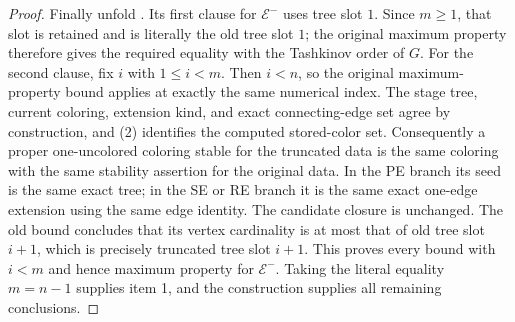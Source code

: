 \begin{proof}
Finally unfold .  Its first clause for
$\mathcal E^-$ uses tree slot $1$.  Since $m\geq1$, that slot is retained
and is literally the old tree slot $1$; the original maximum property
therefore gives the required equality with the Tashkinov order of $G$.
For the second clause, fix $i$ with $1\leq i<m$.  Then $i<n$, so the
original maximum-property bound applies at exactly the same numerical
index.  The stage tree, current coloring, extension kind, and exact
connecting-edge set agree by construction, and (2) identifies the
computed stored-color set.  Consequently a proper one-uncolored coloring
stable for the truncated data is the same coloring with the same
stability assertion for the original data.  In the PE branch its seed is
the same exact tree; in the SE or RE branch it is the same exact one-edge
extension using the same edge identity.  The candidate closure is
unchanged.  The old bound concludes that its vertex cardinality is at
most that of old tree slot $i+1$, which is precisely truncated tree slot
$i+1$.  This proves every bound with $i<m$ and hence maximum property for
$\mathcal E^-$.  Taking the literal equality $m=n-1$ supplies item 1,
and the construction supplies all remaining conclusions.
\end{proof}
